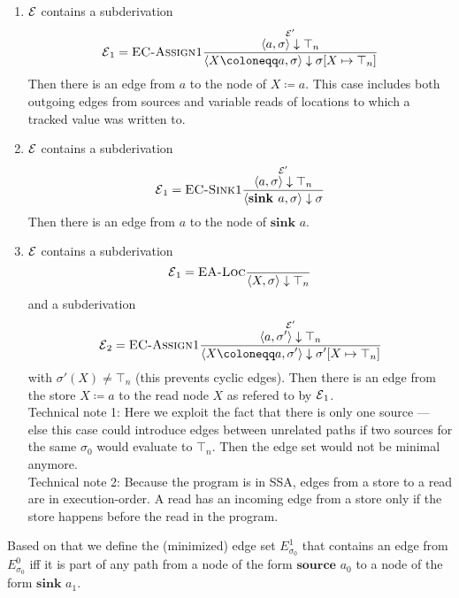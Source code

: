 \begin{enumerate}
    \item $\operatorname{\mathcal{E}}$ contains a subderivation
    \begin{equation*}
        \E_1 = \textsc{EC-Assign1}\ddfrac{\overset{\E'}{\langle a, \sigma \rangle \downarrow \top_n}}
        {\langle X \coloneqq a, \sigma \rangle \downarrow
         \sigma[X \mapsto \top_n]}
    \end{equation*}
    Then there is an edge from $a$ to the node of $X \coloneqq a$.
    This case includes both outgoing edges from sources and variable reads
    of locations to which a tracked value was written to.
    \item $\operatorname{\mathcal{E}}$ contains a subderivation
    \begin{equation*}
        \operatorname{\mathcal{E}}_1 = \textsc{EC-Sink1}\frac{\displaystyle \overset{\operatorname{\mathcal{E}}'}{\langle a, \sigma \rangle \downarrow \top_n}}{\displaystyle \langle \textbf{sink }a, \sigma \rangle \downarrow
         \sigma}
    \end{equation*}
    Then there is an edge from $a$ to the node of $\textbf{sink }a$.
    \item
    $\operatorname{\mathcal{E}}$ contains a subderivation
    \begin{equation*}
        \operatorname{\mathcal{E}}_1 = \textsc{EA-Loc}\frac{\displaystyle }{\displaystyle \langle X, \sigma \rangle \downarrow \top_n}
    \end{equation*}
    and a subderivation
    \begin{equation*}
        \E_2 = \textsc{EC-Assign1}\ddfrac{\overset{\E'}{\langle a, \sigma' \rangle \downarrow \top_n}}
        {\langle X \coloneqq a, \sigma' \rangle \downarrow
         \sigma'[X \mapsto \top_n]}
    \end{equation*}
    with $\sigma'(X) \neq \top_n$ (this prevents cyclic edges).
    Then there is an edge from the store $X \coloneqq a$ to the read node $X$ as 
    refered to by $\operatorname{\mathcal{E}}_1$.\\
    Technical note 1: Here we exploit the fact that there is only one source ---
    else this case could introduce edges between unrelated paths if two sources for the same 
    $\sigma_0$ would evaluate to $\top_n$. Then the edge set would not be minimal
    anymore.\\
    Technical note 2: Because the program is in SSA, edges from a store to a read 
    are in execution-order. A read has an incoming edge from a store only if the 
    store happens before the read in the program.
\end{enumerate}

Based on that we define the (minimized) edge set $E^1_{\sigma_0}$
that contains an edge from $E^0_{\sigma_0}$ iff it is part of any path 
from a node of the form $\textbf{source }a_0$
to a node of the form $\textbf{sink }a_1$.

